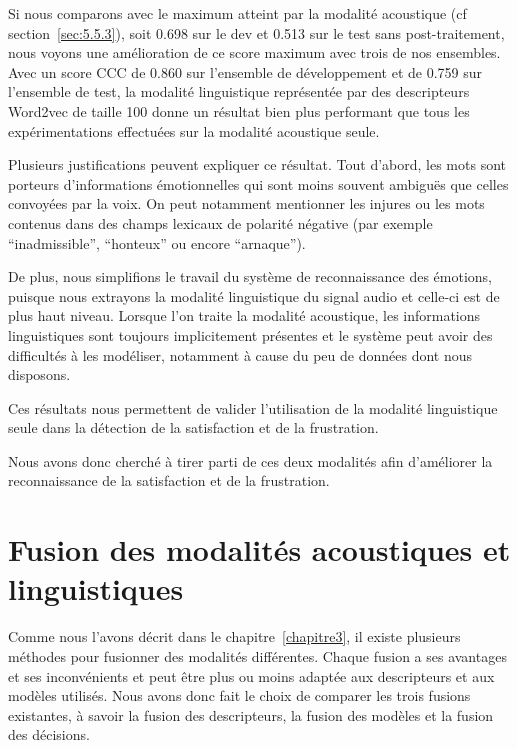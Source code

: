 Si nous comparons avec le maximum atteint par la modalité acoustique (cf section~\ref{sec:5.5.3}), soit 0.698 sur le dev et 0.513 sur le test sans post-traitement, nous voyons une amélioration de ce score maximum avec trois de nos ensembles. Avec un score CCC de 0.860 sur l'ensemble de développement et de 0.759 sur l'ensemble de test, la modalité linguistique représentée par des descripteurs Word2vec de taille 100 donne un résultat bien plus performant que tous les expérimentations effectuées sur la modalité acoustique seule.


Plusieurs justifications peuvent expliquer ce résultat. Tout d'abord, les mots sont porteurs d'informations émotionnelles qui sont moins souvent ambiguës que celles convoyées par la voix. On peut notamment mentionner les injures ou les mots contenus dans des champs lexicaux de polarité négative (par exemple ``inadmissible'', ``honteux'' ou encore ``arnaque'').

De plus, nous simplifions le travail du système de reconnaissance des émotions, puisque nous extrayons la modalité linguistique du signal audio et celle-ci est de plus haut niveau. Lorsque l'on traite la modalité acoustique, les informations linguistiques sont toujours implicitement présentes et le système peut avoir des difficultés à les modéliser, notamment à cause du peu de données dont nous disposons.


Ces résultats nous permettent de valider l'utilisation de la modalité linguistique seule dans la détection de la satisfaction et de la frustration.

Nous avons donc cherché à tirer parti de ces deux modalités afin d'améliorer la reconnaissance de la satisfaction et de la frustration.

\section{Fusion des modalités acoustiques et linguistiques}
Comme nous l'avons décrit dans le chapitre~\ref{chapitre3}, il existe plusieurs méthodes pour fusionner des modalités différentes. Chaque fusion a ses avantages et ses inconvénients et peut être plus ou moins adaptée aux descripteurs et aux modèles utilisés. Nous avons donc fait le choix de comparer les trois fusions existantes, à savoir la fusion des descripteurs, la fusion des modèles et la fusion des décisions.

